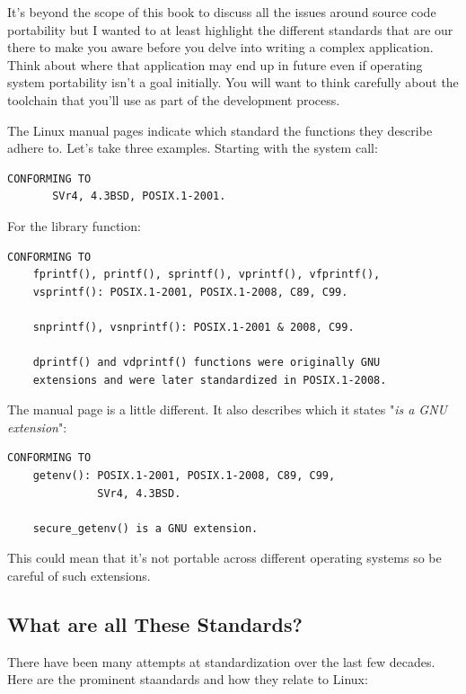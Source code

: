 It's beyond the scope of this book to discuss all the issues around source code portability but I wanted to at least highlight the different standards that are our there to make you aware before you delve into writing a complex application. Think about where that application may end up in future even if operating system portability isn't a goal initially. You will want to think carefully about the toolchain that you'll use as part of the development process. 

The Linux manual pages indicate which standard the functions they describe adhere to. Let's take three examples. Starting with the  system call:

\begin{lstlisting}
CONFORMING TO
	   SVr4, 4.3BSD, POSIX.1-2001.
\end{lstlisting}

\noindent 
For the  library function:

\begin{lstlisting}
CONFORMING TO
	fprintf(), printf(), sprintf(), vprintf(), vfprintf(),
	vsprintf(): POSIX.1-2001, POSIX.1-2008, C89, C99.

	snprintf(), vsnprintf(): POSIX.1-2001 & 2008, C99.

	dprintf() and vdprintf() functions were originally GNU
	extensions and were later standardized in POSIX.1-2008.
\end{lstlisting}

\noindent
The  manual page is a little different. It also describes  which it states "\textit{is a GNU extension}":

\begin{lstlisting}
CONFORMING TO
	getenv(): POSIX.1-2001, POSIX.1-2008, C89, C99, 
	          SVr4, 4.3BSD.

	secure_getenv() is a GNU extension.
\end{lstlisting}

\noindent 
This could mean that it's not portable across different operating systems so be careful of such extensions.

\subsection{What are all These Standards?}

There have been many attempts at standardization over the last few decades. Here are the prominent staandards and how they relate to Linux:

